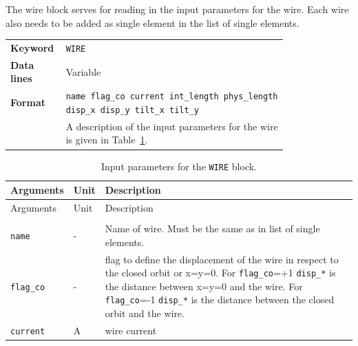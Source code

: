 The wire block serves for reading in the input parameters for the wire.
Each wire also needs to be added as single element in the list of single elements.

\bigskip
\begin{tabular}{@{}lp{0.8\linewidth}}
    \textbf{Keyword}    & \texttt{WIRE} \\
    \textbf{Data lines} & Variable \\
    \textbf{Format}     & \texttt{name flag\_co current int\_length phys\_length disp\_x disp\_y tilt\_x tilt\_y} \\
                        & A description of the input parameters for the wire is given in Table~\ref{tab:wire}.
\end{tabular}

\begin{center}
\begin{longtable}{|p{2.0cm} |p{1.4cm} |p{9.2cm}|}
    \caption{Input parameters for the \texttt{WIRE} block.}
    \label{tab:wire} \\*
    \hline
    \rowcolor{blue!30}
    Arguments & Unit & Description \\*
    \hline
    \endfirsthead

    \hline
    \rowcolor{blue!30}
    Arguments & Unit & Description \\*
    \endhead

    \rowcolor{gray!15}
    \multicolumn{3}{|c|}{(The table continues on the next page)}\\*
    \hline
    \endfoot

    \hline
    \endlastfoot

    \hline

    \texttt{name} & - &
    Name of wire. Must be the same as in list of single elements.\\*
    \hline

    \texttt{flag\_co} & - &
    flag to define the displacement of the wire in respect to the closed orbit or x=y=0. For \texttt{flag\_co}=+1 \texttt{disp\_*} is the distance between x=y=0 and the wire. For \texttt{flag\_co}=-1 \texttt{disp\_*} is the distance between the closed orbit and the wire.\\*
    \hline

    \texttt{current} & A &
    wire current \\*
    \hline


\end{longtable}
\end{center}
